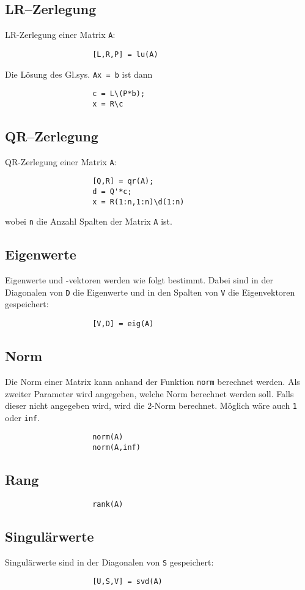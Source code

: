 \documentclass[10pt]{article}
\begin{document}
\begin{multicols*}{3}
			\subsection*{LR--Zerlegung} %
				LR-Zerlegung einer Matrix \verb+A+:
				\begin{verbatim}
					[L,R,P] = lu(A)
				\end{verbatim}
				Die Lösung des Gl.sys. \verb+Ax = b+ ist dann
				\begin{verbatim}
					c = L\(P*b);
					x = R\c
				\end{verbatim}
			\subsection*{QR--Zerlegung} %
				QR-Zerlegung einer Matrix \verb+A+:
				\begin{verbatim}
					[Q,R] = qr(A);
					d = Q'*c;
					x = R(1:n,1:n)\d(1:n)
				\end{verbatim}
				wobei \verb+n+ die Anzahl Spalten der Matrix \verb+A+ ist.
			\subsection*{Eigenwerte} %
				Eigenwerte und -vektoren werden wie folgt bestimmt. Dabei sind in der Diagonalen von \verb+D+ die Eigenwerte und in den Spalten von \verb+V+ die Eigenvektoren gespeichert:
				\begin{verbatim}
					[V,D] = eig(A)
				\end{verbatim}
			\subsection*{Norm} %
				Die Norm einer Matrix kann anhand der Funktion \verb+norm+ berechnet werden. Als zweiter Parameter wird angegeben, welche Norm berechnet werden soll. Falls dieser nicht angegeben wird, wird die 2-Norm berechnet. Möglich wäre auch \verb+1+ oder \verb+inf+.
				\begin{verbatim}
					norm(A)
					norm(A,inf)
				\end{verbatim}
			\subsection*{Rang} %
				\begin{verbatim}
					rank(A)
				\end{verbatim}
			\subsection*{Singulärwerte} %
				Singulärwerte sind in der Diagonalen von \verb+S+ gespeichert:
				\begin{verbatim}
					[U,S,V] = svd(A)
				\end{verbatim}
	\end{multicols*}
\end{document}
